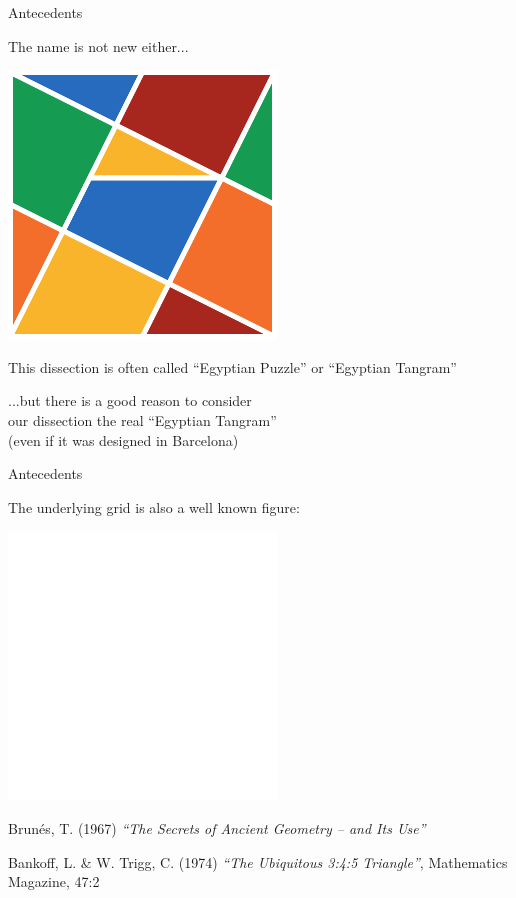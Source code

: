 \documentclass[14pt]{beamer}
\begin{document}
    \begin{frame}{Antecedents}
        \begin{center}
            The name is not new either...

            \bigskip \bigskip

            \includegraphics[height=15ex]{figures/figure000e.pdf}

            \medskip

            {\footnotesize This dissection is often called ``Egyptian Puzzle'' or ``Egyptian Tangram''}
            
            \bigskip \bigskip
        
            ...but there is a good reason to consider\\ our dissection the real ``Egyptian Tangram''\\{\footnotesize (even if it was designed in Barcelona)}
        \end{center}
    \end{frame}


    \begin{frame}{Antecedents}
        \begin{center}
            The underlying grid is also a well known figure:

            \bigskip \bigskip

            \includegraphics[height=15ex]{figures/figure002b.pdf}\\

            \bigskip

            {\footnotesize Brunés, T. (1967) \emph{``The Secrets of Ancient Geometry -- and Its Use''}}

            \medskip

            {\footnotesize Bankoff, L. \& W. Trigg, C. (1974) \emph{``The Ubiquitous 3:4:5 Triangle''}, Mathematics Magazine, 47:2}
        \end{center}
    \end{frame}
\end{document}
